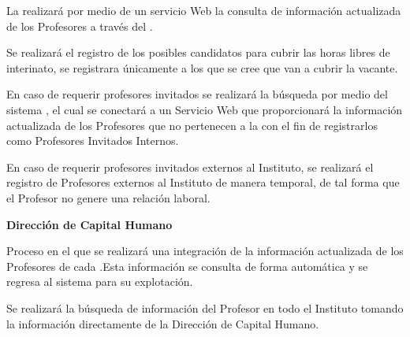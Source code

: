 \begin{PDescripcion}
\begin{enumerate}
		\Ppaso[\PSubProceso] La  realizará por medio de un servicio Web la consulta de información actualizada de los Profesores a través del .		
		
		\Ppaso[\PSubProceso] Se realizará el registro de los posibles candidatos para cubrir las horas libres de interinato, se registrara únicamente a los que se cree que van a cubrir la vacante.
		
		\Ppaso[\PSubProceso] En caso de requerir profesores invitados se realizará la búsqueda por medio del sistema , el cual se conectará a un Servicio Web que proporcionará la información actualizada de los Profesores que no pertenecen a la  con el fin de registrarlos como Profesores Invitados Internos.   
		
		\Ppaso[\PSubProceso] En caso de requerir profesores invitados externos al Instituto, se realizará el registro de Profesores externos al Instituto de manera temporal, de tal forma que el Profesor no genere una relación laboral.   
		
	\end{enumerate}
	
	
	\Ppaso \textbf{Dirección de Capital Humano}
	
	\begin{enumerate}
		
		\Ppaso[\PSubProceso] Proceso en el que se realizará una integración de la información actualizada de los Profesores de cada .Esta información se consulta de forma automática y se regresa al sistema   para su explotación.  		
		
		\Ppaso[\PSubProceso] Se realizará la búsqueda de información del Profesor en todo el Instituto tomando la información directamente de la Dirección de Capital Humano.
		
		
	\end{enumerate}
	
\end{PDescripcion}

